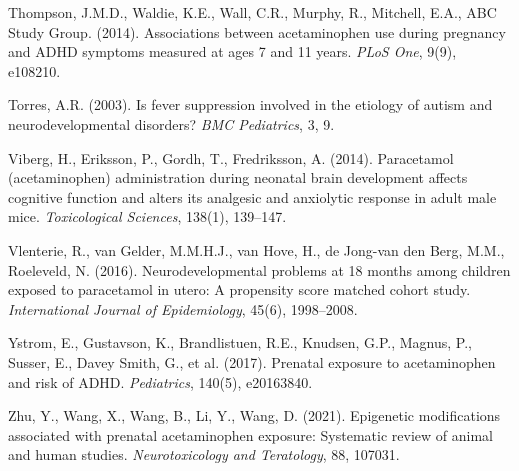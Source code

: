 \documentclass[12pt]{article}
\begin{document}
\begin{thebibliography}{99}
Thompson, J.M.D., Waldie, K.E., Wall, C.R., Murphy, R., Mitchell, E.A., ABC Study Group. (2014).
Associations between acetaminophen use during pregnancy and ADHD symptoms measured at ages 7 and 11 years.
\textit{PLoS One}, 9(9), e108210.

Torres, A.R. (2003).
Is fever suppression involved in the etiology of autism and neurodevelopmental disorders?
\textit{BMC Pediatrics}, 3, 9.

Viberg, H., Eriksson, P., Gordh, T., Fredriksson, A. (2014).
Paracetamol (acetaminophen) administration during neonatal brain development affects cognitive function and alters its analgesic and anxiolytic response in adult male mice.
\textit{Toxicological Sciences}, 138(1), 139--147.

Vlenterie, R., van Gelder, M.M.H.J., van Hove, H., de Jong-van den Berg, M.M., Roeleveld, N. (2016).
Neurodevelopmental problems at 18 months among children exposed to paracetamol in utero: A propensity score matched cohort study.
\textit{International Journal of Epidemiology}, 45(6), 1998--2008.

Ystrom, E., Gustavson, K., Brandlistuen, R.E., Knudsen, G.P., Magnus, P., Susser, E., Davey Smith, G., et al. (2017).
Prenatal exposure to acetaminophen and risk of ADHD.
\textit{Pediatrics}, 140(5), e20163840.

Zhu, Y., Wang, X., Wang, B., Li, Y., Wang, D. (2021).
Epigenetic modifications associated with prenatal acetaminophen exposure: Systematic review of animal and human studies.
\textit{Neurotoxicology and Teratology}, 88, 107031.

\end{thebibliography}
\end{document}
